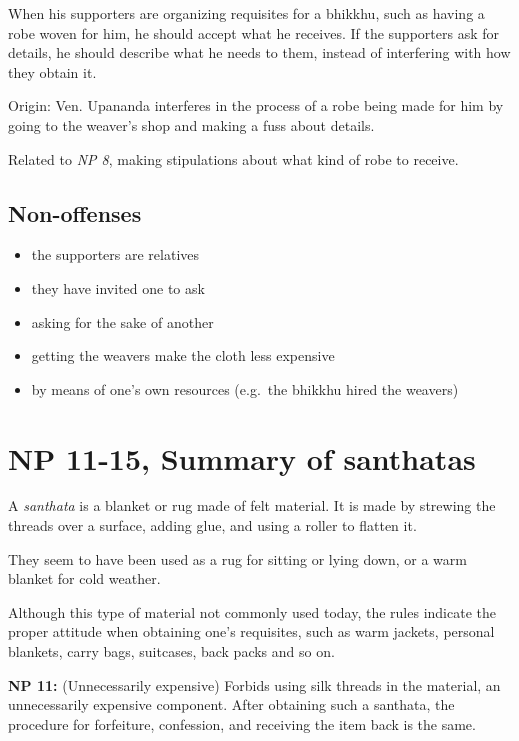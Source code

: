 When his supporters are organizing requisites for a bhikkhu, such as
having a robe woven for him, he should accept what he receives. If the
supporters ask for details, he should describe what he needs to them,
instead of interfering with how they obtain it.

Origin: Ven. Upananda interferes in the process of a robe being made for
him by going to the weaver's shop and making a fuss about details.

Related to \emph{NP 8}, making stipulations about what kind of robe to
receive.

\subsection{Non-offenses}

\begin{itemize}
\tightlist
\item
  the supporters are relatives
\item
  they have invited one to ask
\item
  asking for the sake of another
\item
  getting the weavers make the cloth less expensive
\item
  by means of one's own resources (e.g.~the bhikkhu hired the weavers)
\end{itemize}

\clearpage

\section{NP 11-15, Summary of santhatas}

A \emph{santhata} is a blanket or rug made of felt material. It is made
by strewing the threads over a surface, adding glue, and using a roller
to flatten it.

They seem to have been used as a rug for sitting or lying down, or a
warm blanket for cold weather.

Although this type of material not commonly used today, the rules
indicate the proper attitude when obtaining one's requisites, such as
warm jackets, personal blankets, carry bags, suitcases, back packs and
so on.

\textbf{NP 11:} (Unnecessarily expensive) Forbids using silk threads in
the material, an unnecessarily expensive component. After obtaining such
a santhata, the procedure for forfeiture, confession, and receiving the
item back is the same.

